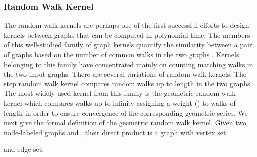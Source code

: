 \documentclass[twoside,11pt]{article}
\begin{document}
\subsubsection{Random Walk Kernel}
The random walk kernels are perhaps one of the first successful efforts to design kernels between graphs that can be computed in polynomial time.
The members of this well-studied family of graph kernels quantify the similarity between a pair of graphs based on the number of common walks in the two graphs .
Kernels belonging to this family have concentrated mainly on counting matching walks in the two input graphs.
There are several variations of random walk kernels.
The -step random walk kernel compares random walks up to length  in the two graphs.
The most widely-used kernel from this family is the geometric random walk kernel  which compares walks up to infinity assigning a weight  () to walks of length  in order to ensure convergence of the corresponding geometric series.
We next give the formal definition of the geometric random walk kernel.
Given two node-labeled graphs  and , their direct product  is a graph with vertex set:

and edge set:
\end{document}
